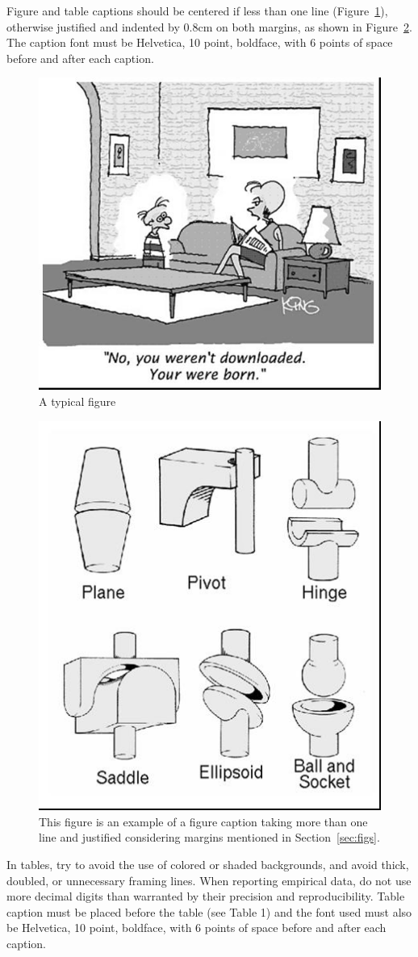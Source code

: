 \documentclass[12pt]{article}
\begin{document}
Figure and table captions should be centered if less than one line
(Figure~\ref{fig:exampleFig1}), otherwise justified and indented by 0.8cm on
both margins, as shown in Figure~\ref{fig:exampleFig2}. The caption font must
be Helvetica, 10 point, boldface, with 6 points of space before and after each
caption.

\begin{figure}[ht]
\centering
\includegraphics[width=.5\textwidth]{fig1.jpg}
\caption{A typical figure}
\label{fig:exampleFig1}
\end{figure}

\begin{figure}[ht]
\centering
\includegraphics[width=.3\textwidth]{fig2.jpg}
\caption{This figure is an example of a figure caption taking more than one
  line and justified considering margins mentioned in Section~\ref{sec:figs}.}
\label{fig:exampleFig2}
\end{figure}

In tables, try to avoid the use of colored or shaded backgrounds, and avoid
thick, doubled, or unnecessary framing lines. When reporting empirical data,
do not use more decimal digits than warranted by their precision and
reproducibility. Table caption must be placed before the table (see Table 1)
and the font used must also be Helvetica, 10 point, boldface, with 6 points of
space before and after each caption.
\end{document}
